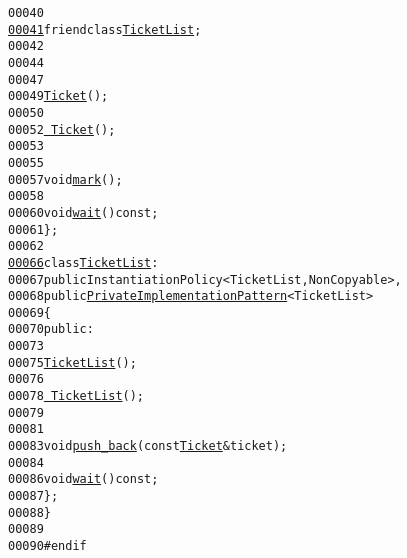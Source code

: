 \begin{footnotesize}
\begin{alltt}
00040 
\hypertarget{ticket_8hh_source_l00041}{}\hyperlink{classeos_1_1Ticket_ac0aa77ee461a5d61db873f8c71163cb3}{00041}             \textcolor{keyword}{friend} \textcolor{keyword}{class }\hyperlink{classeos_1_1TicketList}{TicketList};
00042 
00044 
00047 
00049             \hyperlink{classeos_1_1Ticket_a3d191abdf730fab31d131aeaf3214878}{Ticket}();
00050 
00052             \hyperlink{classeos_1_1Ticket_a83323881ce189b387cb1358a2c8c63b0}{~Ticket}();
00053 
00055 
00057             \textcolor{keywordtype}{void} \hyperlink{classeos_1_1Ticket_a32a1041ca14a3a41b3f5ac9ea040b452}{mark}();
00058 
00060             \textcolor{keywordtype}{void} \hyperlink{classeos_1_1Ticket_ab3dc3b4e907527f14d54a49269e8174d}{wait}() \textcolor{keyword}{const};
00061     \};
00062 
\hypertarget{ticket_8hh_source_l00066}{}\hyperlink{classeos_1_1TicketList}{00066}     \textcolor{keyword}{class }\hyperlink{classeos_1_1TicketList}{TicketList} :
00067         \textcolor{keyword}{public} InstantiationPolicy<TicketList, NonCopyable>,
00068         \textcolor{keyword}{public} \hyperlink{classeos_1_1PrivateImplementationPattern}{PrivateImplementationPattern}<TicketList>
00069     \{
00070         \textcolor{keyword}{public}:
00073 
00075             \hyperlink{classeos_1_1TicketList_a7d61cc782f984a4ec8665d3cdfc5489a}{TicketList}();
00076 
00078             \hyperlink{classeos_1_1TicketList_a948cabad909856a5d32cd3f90156b4d1}{~TicketList}();
00079 
00081 
00083             \textcolor{keywordtype}{void} \hyperlink{classeos_1_1TicketList_a150d362cc9ab4ffdb821edec64b76abe}{push_back}(\textcolor{keyword}{const} \hyperlink{classeos_1_1Ticket}{Ticket} & ticket);
00084 
00086             \textcolor{keywordtype}{void} \hyperlink{classeos_1_1TicketList_ac152da1ea00be93a0c59150f132c6ad3}{wait}() \textcolor{keyword}{const};
00087     \};
00088 \}
00089 
00090 \textcolor{preprocessor}{#endif}
\end{alltt}\end{footnotesize}
